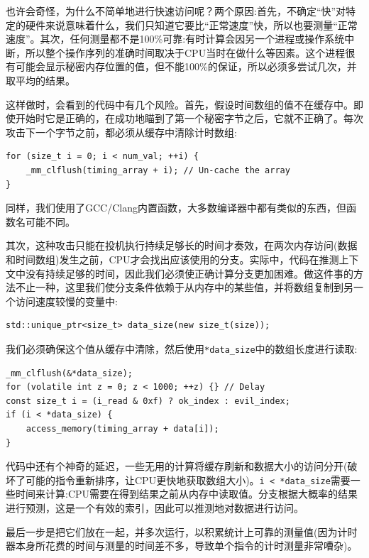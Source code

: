 也许会奇怪，为什么不简单地进行快速访问呢？两个原因:首先，不确定“快”对特定的硬件来说意味着什么，我们只知道它要比“正常速度”快，所以也要测量“正常速度”。其次，任何测量都不是100\%可靠:有时计算会因另一个进程或操作系统中断，所以整个操作序列的准确时间取决于CPU当时在做什么等因素。这个进程很有可能会显示秘密内存位置的值，但不能100\%的保证，所以必须多尝试几次，并取平均的结果。

这样做时，会看到的代码中有几个风险。首先，假设时间数组的值不在缓存中。即使开始时它是正确的，在成功地瞄到了第一个秘密字节之后，它就不正确了。每次攻击下一个字节之前，都必须从缓存中清除计时数组:

\begin{lstlisting}[style=styleCXX]
for (size_t i = 0; i < num_val; ++i) {
	_mm_clflush(timing_array + i); // Un-cache the array
}
\end{lstlisting}

同样，我们使用了GCC/Clang内置函数，大多数编译器中都有类似的东西，但函数名可能不同。

其次，这种攻击只能在投机执行持续足够长的时间才奏效，在两次内存访问(数据和时间数组)发生之前，CPU才会找出应该使用的分支。实际中，代码在推测上下文中没有持续足够的时间，因此我们必须使正确计算分支更加困难。做这件事的方法不止一种，这里我们使分支条件依赖于从内存中的某些值，并将数组复制到另一个访问速度较慢的变量中:

\begin{lstlisting}[style=styleCXX]
std::unique_ptr<size_t> data_size(new size_t(size));
\end{lstlisting}

我们必须确保这个值从缓存中清除，然后使用\texttt{*data\_size}中的数组长度进行读取:

\begin{lstlisting}[style=styleCXX]
_mm_clflush(&*data_size);
for (volatile int z = 0; z < 1000; ++z) {} // Delay
const size_t i = (i_read & 0xf) ? ok_index : evil_index;
if (i < *data_size) {
	access_memory(timing_array + data[i]);
}
\end{lstlisting}

代码中还有个神奇的延迟，一些无用的计算将缓存刷新和数据大小的访问分开(破坏了可能的指令重新排序，让CPU更快地获取数组大小)。\texttt{i < *data\_size}需要一些时间来计算:CPU需要在得到结果之前从内存中读取值。分支根据大概率的结果进行预测，这是一个有效的索引，因此可以推测地对数据进行访问。


最后一步是把它们放在一起，并多次运行，以积累统计上可靠的测量值(因为计时器本身所花费的时间与测量的时间差不多，导致单个指令的计时测量非常嘈杂)。

